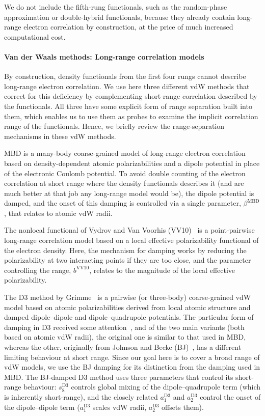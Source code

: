 We do not include the fifth-rung functionals, such as the random-phase approximation or double-hybrid functionals, because they already contain long-range electron correlation by construction, at the price of much increased computational cost.

\paragraph{Van der Waals methods: Long-range correlation models}

By construction, density functionals from the first four rungs cannot describe long-range electron correlation.
We use here three different vdW methods that correct for this deficiency by complementing short-range correlation described by the functionals.
All three have some explicit form of range separation built into them, which enables us to use them as probes to examine the implicit correlation range of the functionals.
Hence, we briefly review the range-separation mechanisms in these vdW methods.

MBD is a many-body coarse-grained model of long-range electron correlation based on density-dependent atomic polarizabilities and a dipole potential in place of the electronic Coulomb potential.
To avoid double counting of the electron correlation at short range where the density functionals describes it (and are much better at that job any long-range model would be), the dipole potential is damped, and the onset of this damping is controlled via a single parameter, $\beta^\text{MBD}$, that relates to atomic vdW radii.

The nonlocal functional of Vydrov and Van Voorhis (VV10)~\cite{VydrovJCP10a} is a point-pairwise long-range correlation model based on a local effective polarizability functional of the electron density.
Here, the mechanism for damping works by reducing the polarizability at two interacting points if they are too close, and the parameter controlling the range, $b^\text{VV10}$, relates to the magnitude of the local effective polarizability.

The D3 method by Grimme~\cite{GrimmeJCP10} is a pairwise (or three-body) coarse-grained vdW model based on atomic polarizabilities derived from local atomic structure and damped dipole--dipole and dipole--quadrupole potentials.
The particular form of damping in D3 received some attention~\cite{GrimmeJCC11,SchroderJCTC15,SmithJPCL16,WitteJCTC17}, and of the two main variants (both based on atomic vdW radii), the original one is similar to that used in MBD, whereas the other, originally from Johnson and Becke (BJ)~\cite{JohnsonJCP06}, has a different limiting behaviour at short range.
Since our goal here is to cover a broad range of vdW models, we use the BJ damping for its distinction from the damping used in MBD\@.
The BJ-damped D3 method uses three parameters that control its short-range behaviour: $s_8^\text{D3}$ controls global mixing of the dipole--quadrupole term (which is inherently short-range), and the closely related $a_1^\text{D3}$ and $a_2^\text{D3}$ control the onset of the dipole--dipole term ($a_1^\text{D3}$ scales vdW radii, $a_2^\text{D3}$ offsets them).

